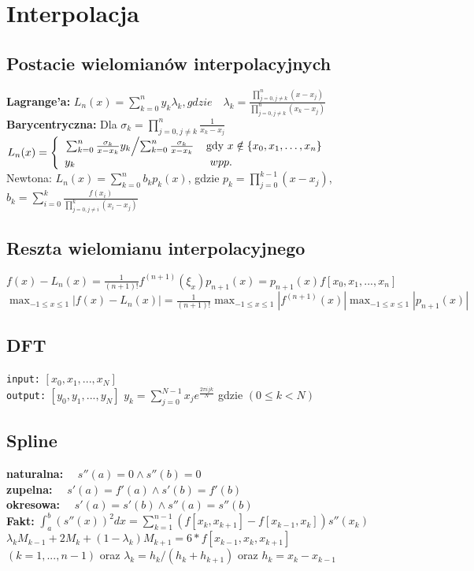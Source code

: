 \documentclass[a4paper,twocolumn]{article}
\begin{document}
\section{Interpolacja}

\subsection{Postacie wielomianów interpolacyjnych}
\textbf{Lagrange'a:} $L_n(x) =\sum_{k=0}^ny_k
\lambda_k ,gdzie\quad \lambda_k=\frac{\prod_{j=0, j\neq k}^{n}(x-x_j)}{\prod_{j=0, j\neq k}^{n}(x_k-x_j)}$\\
\textbf{Barycentryczna:}
Dla $\sigma_k = \prod^n_{j=0, j\neq k}\frac{1}{x_k-x_j}$\\
$  L_n(x) = \left\{ \begin{array}{ll}
\left. \sum_{k=0}^n\frac{\sigma_k}{x-x_k}y_k \middle/ \sum_{k=0}^n\frac{\sigma_k}{x-x_k} \right. & \textrm{gdy $x \notin \left\{ x_0,x_1,\dots,x_n \right\} $}\\
y_k & \textrm{ $ wpp. $}
\end{array} \right.
$\\
Newtona: 
$ L_n(x) = \sum_{k=0}^n b_kp_k(x)$, gdzie $p_k = \prod_{j = 0}^{k-1} (x - x_j)$, \\
$b_k = \sum_{i = 0}^k \frac{f(x_i)}{\prod_{j = 0, j\neq i}^k (x_i - x_j)}$

\subsection{Reszta wielomianu interpolacyjnego}
$f(x)-L_n(x) = \frac{1}{(n+1)!}f^{(n+1)}(\xi_x)p_{n+1}(x) = p_{n+1}(x)f[x_0, x_1, ..., x_n]$\\
$\max_{-1\leq x \leq 1} | f(x)-L_n(x) | = \frac{1}{(n+1)!}\max_{-1\leq x \leq 1} | f^{(n+1)}(x) | \max_{-1\leq x \leq 1} | p_{n+1}(x) |$
\subsection{DFT}
\texttt{input:} $[x_0, x_1, ..., x_N]$\\
\texttt{output:} $[y_0, y_1, ..., y_N]$
$y_k = \sum_{j = 0}^{N-1} x_j e^{\frac{2 \pi i j k}{N}} $ gdzie $ (0 \leqslant k < N)$
\subsection{Spline}
\textbf{naturalna:} $\quad s''(a)=0 \land s''(b)=0$\\
\textbf{zupelna:} $\quad s'(a)=f'(a) \land s'(b)=f'(b)$\\
\textbf{okresowa:} $\quad s'(a)=s'(b) \land s''(a)=s''(b)$\\
\textbf{Fakt:} $\int_a^b \left(s''(x)\right)^2 dx = \sum_{k=1}^{n-1} \left( f\left[x_k,x_{k+1}\right] - f\left[x_{k-1},x_k\right]\right)s''(x_k) $\\
$\lambda_{k}M_{k-1}+2M_{k}+(1-\lambda_{k})M_{k+1}=6*f[x_{k-1},x_{k},x_{k+1}]$\\ $(k=1,...,n-1)$ oraz $\lambda_{k} = h_{k}/(h_{k}+h_{k+1})$ oraz $h_{k}=x_{k} - x_{k-1}$
\end{document}
